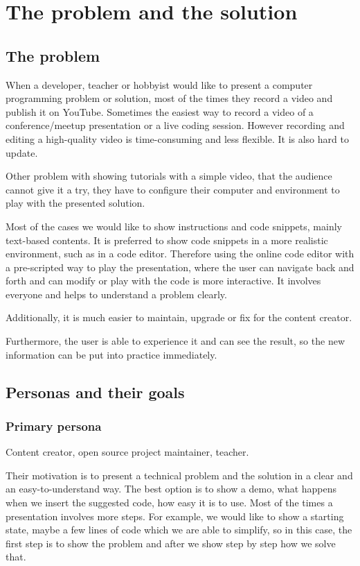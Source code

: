 \section{The problem and the
solution}\label{the-problem-and-the-solution}

\subsection{The problem}\label{the-problem}

When a developer, teacher or hobbyist would like to present a computer
programming problem or solution, most of the times they record a video
and publish it on YouTube. Sometimes the easiest way to record a video
of a conference/meetup presentation or a live coding session. However
recording and editing a high-quality video is time-consuming and less
flexible. It is also hard to update.

Other problem with showing tutorials with a simple video, that the
audience cannot give it a try, they have to configure their computer and
environment to play with the presented solution.

Most of the cases we would like to show instructions and code snippets,
mainly text-based contents. It is preferred to show code snippets in a
more realistic environment, such as in a code editor. Therefore using
the online code editor with a pre-scripted way to play the presentation,
where the user can navigate back and forth and can modify or play with
the code is more interactive. It involves everyone and helps to
understand a problem clearly.

Additionally, it is much easier to maintain, upgrade or fix for the
content creator.

Furthermore, the user is able to experience it and can see the result,
so the new information can be put into practice immediately.

\subsection{Personas and their goals}\label{personas-and-their-goals}

\subsubsection{Primary persona}\label{primary-persona}

Content creator, open source project maintainer, teacher.

Their motivation is to present a technical problem and the solution in a
clear and an easy-to-understand way. The best option is to show a demo,
what happens when we insert the suggested code, how easy it is to use.
Most of the times a presentation involves more steps. For example, we
would like to show a starting state, maybe a few lines of code which we
are able to simplify, so in this case, the first step is to show the
problem and after we show step by step how we solve that.

